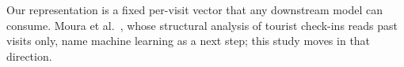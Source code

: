 
Our representation is a fixed per-visit vector that any downstream model
can consume. Moura et al.~\cite{moura2025mobilityaware}, whose structural
analysis of tourist check-ins reads past visits only, name machine learning
as a next step; this study moves in that direction.
